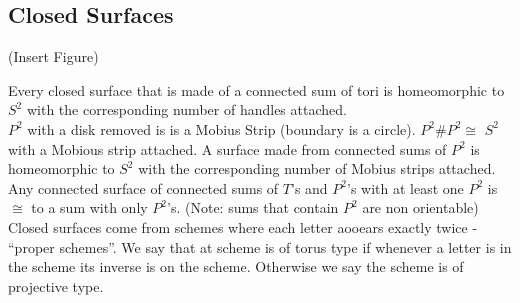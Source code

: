 
\subsection{Closed Surfaces}

(Insert Figure)

Every closed surface that is made of a connected sum of tori is homeomorphic to $S^2$ with the corresponding number of handles attached. \\
$P^2$ with a disk removed is is a Mobius Strip (boundary is a circle). $P^2 \# P^2 \cong$ $S^2$ with a Mobious strip attached. A surface made from connected sums of $P^2$ is homeomorphic to $S^2$ with the corresponding number of Mobius strips attached. \\
Any connected surface of connected sums of $T$'s and $P^2$'s with at least one $P^2$ is $\cong$ to a sum with only $P^2$'s. (Note: sums that contain $P^2$ are non orientable) \\ 

\noindent
Closed surfaces come from schemes where each letter aooears exactly twice - ``proper schemes''. We say that at scheme is of torus type if whenever a letter is in the scheme its inverse is on the scheme. Otherwise we say the scheme is of projective type. 